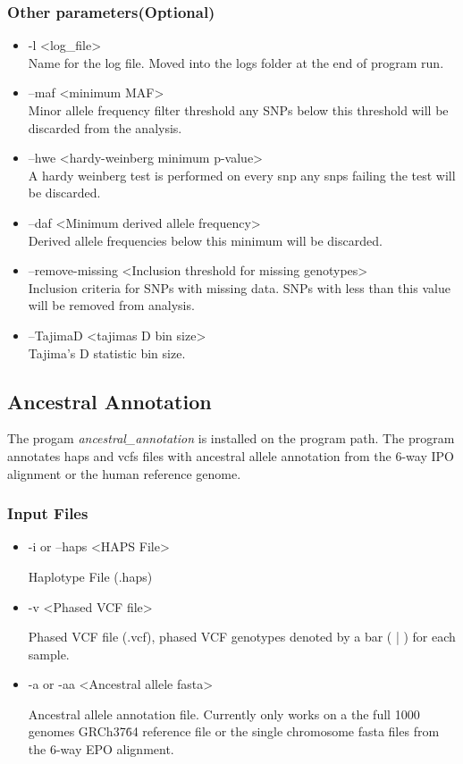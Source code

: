 \documentclass[a4paper,10pt]{article}
\begin{document}
\subsubsection{Other parameters(Optional)}
\begin{itemize}
\item -l <log\_file> \\
Name for the log file. Moved into the logs folder at the end of program run.
\item --maf <minimum MAF>\\
Minor allele frequency filter threshold any SNPs below this threshold will be discarded from the analysis.
\item --hwe <hardy-weinberg minimum p-value>\\
A hardy weinberg test is performed on every snp any snps failing the test will be discarded.
\item --daf <Minimum derived allele frequency>\\
Derived allele frequencies below this minimum will be discarded.
\item --remove-missing <Inclusion threshold for missing genotypes>\\
Inclusion criteria for SNPs with missing data. SNPs with less than this value will be removed from analysis.
\item --TajimaD <tajimas D bin size>\\
Tajima's D statistic bin size.
\end{itemize}
\subsection{Ancestral Annotation}
The progam \emph{ancestral\_annotation} is installed on the program path. The program annotates haps and vcfs files with ancestral allele annotation from the 6-way IPO alignment or the human reference genome.
\subsubsection{Input Files}
\begin{itemize}
\item -i or --haps <HAPS File>

Haplotype File (.haps)

\item -v <Phased VCF file>

Phased VCF file (.vcf), phased VCF genotypes denoted by a bar ( | ) for each sample.
\item -a or -aa <Ancestral allele fasta>

Ancestral allele annotation file. Currently only works on a the full 1000 genomes GRCh37\.64 reference file or the single chromosome fasta files from the 6-way EPO alignment.
\end{itemize}
\end{document}
